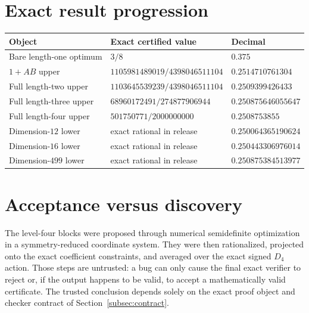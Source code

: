 \documentclass[11pt]{article}
\newcommand{\1}{\mathbb{1}}
\begin{document}
\section{Exact result progression}
\begin{center}
\begin{tabular}{lll}
\toprule
Object & Exact certified value & Decimal\\
\midrule
Bare length-one optimum & $3/8$ & $0.375$\\
$1{+}AB$ upper & $1105981489019/4398046511104$ & $0.2514710761304$\\
Full length-two upper & $1103645539239/4398046511104$ & $0.2509399426433$\\
Full length-three upper & $68960172491/274877906944$ & $0.250875646055647$\\
Full length-four upper & $501750771/2000000000$ & $0.2508753855$\\
Dimension-$12$ lower & exact rational in release & $0.250064365190624$\\
Dimension-$16$ lower & exact rational in release & $0.250443306976014$\\
Dimension-$499$ lower & exact rational in release & $0.250875384513977$\\
\bottomrule
\end{tabular}
\end{center}

\section{Acceptance versus discovery}
The level-four blocks were proposed through numerical semidefinite optimization in a symmetry-reduced coordinate system.  They were then rationalized, projected onto the exact coefficient constraints, and averaged over the exact signed $D_4$ action.  Those steps are untrusted: a bug can only cause the final exact verifier to reject or, if the output happens to be valid, to accept a mathematically valid certificate.  The trusted conclusion depends solely on the exact proof object and checker contract of Section~\ref{subsec:contract}.
\end{document}
